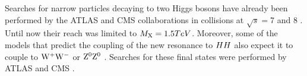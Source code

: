 
Searches for narrow particles decaying to two Higgs bosons have already been performed by the ATLAS \cite{Aad:2014yja, Aad:2015uka, Aad:2015xja} and CMS \cite{Khachatryan:2014jya,Khachatryan:2015year,Khachatryan:2015tha} collaborations in \Pp\Pp collisions at $\sqrt{s} = $7 and 8 \TeV. Until now their reach was limited to $M_{\rm X} = 1.5TeV$. Moreover, some of the models that predict the coupling of the new resonance to $HH$ also expect it to couple to $\rm W^{+}\rm W^{-}$ or $\rm Z^{0}\rm Z^{0}$ \cite{Brehmer:2015dan}. Searches for these final states were performed by ATLAS and CMS \cite{ATLASVV, ATLASWV, ATLASZV, Khachatryan:2014hpa, CMSZVWV}. 





